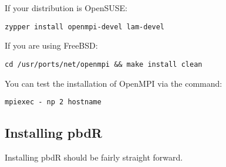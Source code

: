 If your distribution is OpenSUSE:
\begin{lstlisting}[title=Installing OpenMPI on OpenSUSE Linux]
zypper install openmpi-devel lam-devel
\end{lstlisting}

If you are using FreeBSD:
\begin{lstlisting}[title=Installing OpenMPI on FreeBSD]
cd /usr/ports/net/openmpi && make install clean
\end{lstlisting}




You can test the installation of OpenMPI via the command:

\begin{lstlisting}[title=Shell Command]
mpiexec - np 2 hostname
\end{lstlisting}



\subsection{Installing pbdR}

Installing pbdR should be fairly straight forward.


